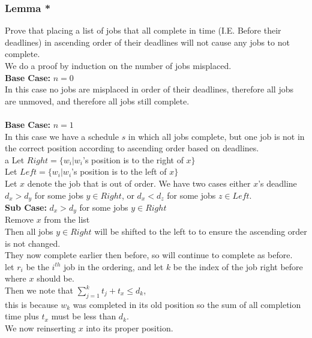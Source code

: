 \documentclass{article}
\begin{document}
      \subsubsection{Lemma *}
        Prove that placing a list of jobs that all complete in time (I.E. Before their deadlines) in ascending order of their deadlines will not cause any jobs to not complete. \\
        We do a proof by induction on the number of jobs misplaced. \\
        \textbf{Base Case:} $n = 0$ \\
        In this case no jobs are misplaced in order of their deadlines, therefore all jobs are unmoved, and therefore all jobs still complete. \\
        \\
        \textbf{Base Case:} $n = 1$ \\
        In this case we have a schedule $s$ in which all jobs complete, but one job is not in the correct position according to ascending order based on deadlines. \\a
        Let $Right = \{w_{i} | w_{i}$'s position is to the right of $x\}$ \\ 
        Let $Left = \{w_{i} | w_{i}$'s position is to the left of $x\}$ \\ 
        Let $x$ denote the job that is out of order. We have two cases either $x$'s deadline $d_{x} > d_{y}$ for some jobs $y \in Right$, or $d_{x} < d_{z}$ for some jobs $z \in Left$. \\
        \textbf{Sub Case:} $d_{x} > d_{y}$ for some jobs $y \in Right$ \\
        \indent Remove $x$ from the list \\
        \indent Then all jobs $y \in Right$ will be shifted to the left to to ensure the ascending order is not changed. \\
        \indent They now complete earlier then before, so will continue to complete as before. \\
        \indent let $r_{i}$ be the $i^{th}$ job in the ordering, and let $k$ be the index of the job right before where $x$ should be. \\
        \indent Then we note that $\sum_{j = 1}^{k} t_{j} + t_{x} \leq d_{k}$, \\
        \indent this is because $w_{k}$ was completed in its old position so the sum of all completion time plus $t_{x}$ must be less than $d_{k}$. \\
        \indent We now reinserting $x$ into its proper position. \\
\end{document}
